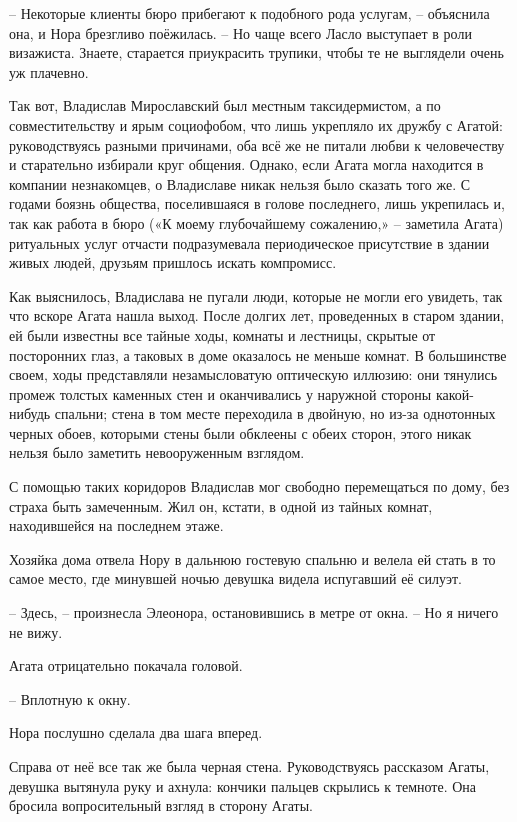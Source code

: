 \documentclass[
  a5paperpaper,
  DIV=11,
  numbers=noendperiod]{scrreprt}
\begin{document}
-- Некоторые клиенты бюро прибегают к подобного рода услугам, --
объяснила она, и Нора брезгливо поёжилась. -- Но чаще всего Ласло
выступает в роли визажиста. Знаете, старается приукрасить трупики, чтобы
те не выглядели очень уж плачевно.

Так вот, Владислав Мирославский был местным таксидермистом, а по
совместительству и ярым социофобом, что лишь укрепляло их дружбу с
Агатой: руководствуясь разными причинами, оба всё же не питали любви к
человечеству и старательно избирали круг общения. Однако, если Агата
могла находится в компании незнакомцев, о Владиславе никак нельзя было
сказать того же. С годами боязнь общества, поселившаяся в голове
последнего, лишь укрепилась и, так как работа в бюро («К моему
глубочайшему сожалению,» -- заметила Агата) ритуальных услуг отчасти
подразумевала периодическое присутствие в здании живых людей, друзьям
пришлось искать компромисс.

Как выяснилось, Владислава не пугали люди, которые не могли его увидеть,
так что вскоре Агата нашла выход. После долгих лет, проведенных в старом
здании, ей были известны все тайные ходы, комнаты и лестницы, скрытые от
посторонних глаз, а таковых в доме оказалось не меньше комнат. В
большинстве своем, ходы представляли незамысловатую оптическую иллюзию:
они тянулись промеж толстых каменных стен и оканчивались у наружной
стороны какой-нибудь спальни; стена в том месте переходила в двойную, но
из-за однотонных черных обоев, которыми стены были обклеены с обеих
сторон, этого никак нельзя было заметить невооруженным взглядом.

С помощью таких коридоров Владислав мог свободно перемещаться по дому,
без страха быть замеченным. Жил он, кстати, в одной из тайных комнат,
находившейся на последнем этаже.

Хозяйка дома отвела Нору в дальнюю гостевую спальню и велела ей стать в
то самое место, где минувшей ночью девушка видела испугавший её силуэт.

-- Здесь, -- произнесла Элеонора, остановившись в метре от окна. -- Но я
ничего не вижу.

Агата отрицательно покачала головой.

-- Вплотную к окну.

Нора послушно сделала два шага вперед.

Справа от неё все так же была черная стена. Руководствуясь рассказом
Агаты, девушка вытянула руку и ахнула: кончики пальцев скрылись к
темноте. Она бросила вопросительный взгляд в сторону Агаты.
\end{document}
